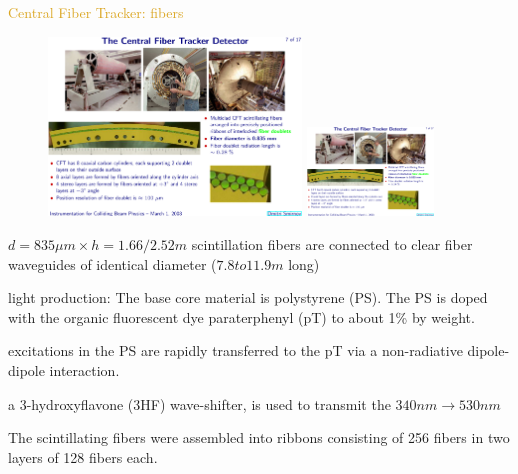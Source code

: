 \begin{frame}{\textcolor{Goldenrod}{Central Fiber Tracker: fibers}}
  \begin{overlayarea}{\textwidth}{\textheight}
    \begin{figure}[h]\centering
      \includegraphics[height=0.3\textheight, width=0.6\textwidth]{./Images/15_CFT}
      \includegraphics[height=0.3\textheight, width=0.3\textwidth]{./Images/16_CFT}
    \end{figure}
    \itt[<only@+>]

  \item  $d = 835 \mu m \times h =1.66/2.52 m$ scintillation fibers are 
    connected to clear fiber waveguides of identical diameter ($7.8 to 11.9 m$ long)
    
  \item light production: The base core material is polystyrene (PS). The PS is
    doped with the organic fluorescent dye paraterphenyl (pT) to
    about 1\% by weight.
  \item excitations in the PS are rapidly transferred to the pT via a
    non-radiative dipole-dipole interaction.
    
  \item a 3-hydroxyflavone (3HF) wave-shifter, is used to
    transmit the $340 nm \to 530 nm$
  \item The scintillating fibers were assembled into ribbons
    consisting of 256 fibers in two layers of 128 fibers each.
    \tti
  \end{overlayarea}
\end{frame}


      
